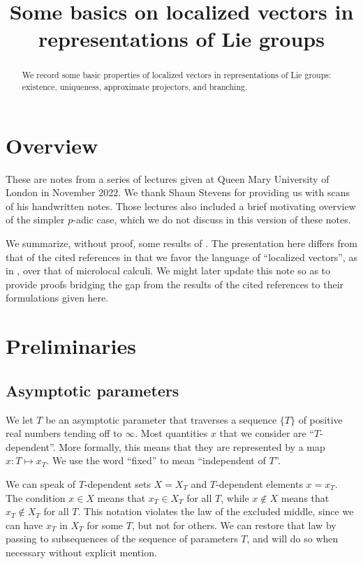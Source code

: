 \documentclass[reqno]{amsart} 
\title{Some basics on localized vectors in representations of Lie groups}
\numberwithin{equation}{section}
\begin{document}
\maketitle
\tableofcontents

\begin{abstract}
We record some basic properties of localized vectors in representations of Lie groups: existence, uniqueness, approximate projectors, and branching.
\end{abstract}

\section{Overview}\label{sec:d1a8de613824}
These are notes from a series of lectures given at Queen Mary University of London in November 2022.  We thank Shaun Stevens for providing us with scans of his handwritten notes.  Those lectures also included a brief motivating overview of the simpler $p$-adic case, which we do not discuss in this version of these notes.

We summarize, without proof, some results of \cite{nelson-venkatesh-1, 2020arXiv201202187N, 2021arXiv210915230N}.  The presentation here differs from that of the cited references in that we favor the language of ``localized vectors'', as in \cite[\S1.7]{nelson-venkatesh-1}, over that of microlocal calculi.  We might later update this note so as to provide proofs bridging the gap from the results of the cited references to their formulations given here.

\section{Preliminaries}\label{sec:d1a8de613e9a}
\subsection{Asymptotic parameters}\label{sec:d1a8dda545b5}
We let $T$ be an asymptotic parameter that traverses a sequence $\{T\}$ of positive real numbers tending off to $\infty$.  Most quantities $x$ that we consider are ``$T$-dependent''.  More formally, this means that they are represented by a map $x: T \mapsto x_T$.  We use the word ``fixed'' to mean ``independent of $T$''.

We can speak of $T$-dependent sets $X = X_T$ and $T$-dependent elements $x = x_T$.  The condition $x \in X$ means that $x_T \in X_T$ for all $T$, while $x \notin X$ means that $x_T \notin X_T$ for all $T$.  This notation violates the law of the excluded middle, since we can have $x_T$ in $X_T$ for some $T$, but not for others.  We can restore that law by passing to subsequences of the sequence of parameters $T$, and will do so when necessary without explicit mention.
\end{document}
